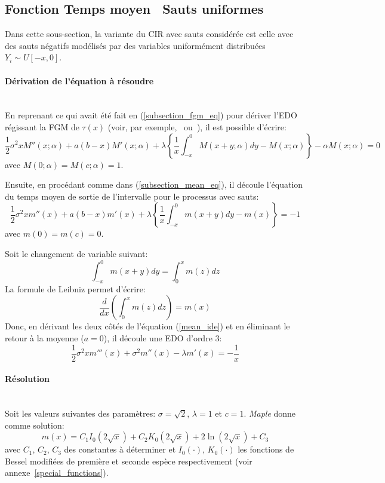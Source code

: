 \subsection{Fonction Temps moyen \textemdash~Sauts uniformes}\label{subsection_mean_jumps}
Dans cette sous-section, la variante du \ac{CIR} avec sauts considérée est celle avec des sauts négatifs modélisés par des variables uniformément distribuées $Y_i\sim U[-x,0]$.

\paragraph{Dérivation de l'équation à résoudre}\phantom{}\\
En reprenant ce qui avait été fait en (\ref{subsection_fgm_eq}) pour dériver l'\acs{EDO} régissant la \acl{FGM} de $\tau(x)$ (voir, par exemple,~\cite{cox2017} ou~\cite{lefebvre2007}), il est possible d'écrire:
\[
\frac{1}{2}\sigma^2 xM''(x;\alpha)+a(b-x)M'(x;\alpha)+\lambda\left\{\frac{1}{x}\int_{-x}^0M(x+y;\alpha)dy-M(x;\alpha)\right\}-\alpha M(x;\alpha)=0
\]
avec $M(0;\alpha)=M(c;\alpha)=1$.

Ensuite, en procédant comme dans (\ref{subsection_mean_eq}), il découle l'équation du temps moyen de sortie de l'intervalle pour le processus avec sauts:
\begin{equation}\label{mean_ide}
    \frac{1}{2}\sigma^2 xm''(x)+a(b-x)m'(x)+\lambda\left\{\frac{1}{x}\int_{-x}^0m(x+y)dy-m(x)\right\}=-1
\end{equation}
avec $m(0)=m(c)=0$.

Soit le changement de variable suivant:
\begin{equation}\label{variable_change_mean}
    \int_{-x}^0m(x+y)dy=\int_0^x m(z)dz
\end{equation}
La formule de Leibniz permet d'écrire:
\[
\frac{d}{dx}\left(\int_0^x m(z)dz\right)=m(x)
\]
Donc, en dérivant les deux côtés de l'équation (\ref{mean_ide}) et en éliminant le retour à la moyenne ($a=0$), il découle une \acs{EDO} d'ordre 3:
\begin{equation}\label{mean_3rd_order}
    \frac{1}{2}\sigma^2xm'''(x)+\sigma^2m''(x)-\lambda m'(x)=-\frac{1}{x}
\end{equation}

\paragraph{Résolution}\phantom{}\\
Soit les valeurs suivantes des paramètres: $\sigma=\sqrt{2}$, $\lambda=1$ et $c=1$. \textit{Maple} donne comme solution:
\begin{equation}\label{sol_mean_with_jumps}
    m(x)=C_1I_0(2\sqrt{x})+C_2K_0(2\sqrt{x})+2\ln(2\sqrt{x})+C_3
\end{equation}
avec $C_1$, $C_2$, $C_3$ des constantes à déterminer et $I_0(\cdot)$, $K_0(\cdot)$ les fonctions de Bessel modifiées de première et seconde espèce respectivement (voir annexe~\ref{special_functions}).

